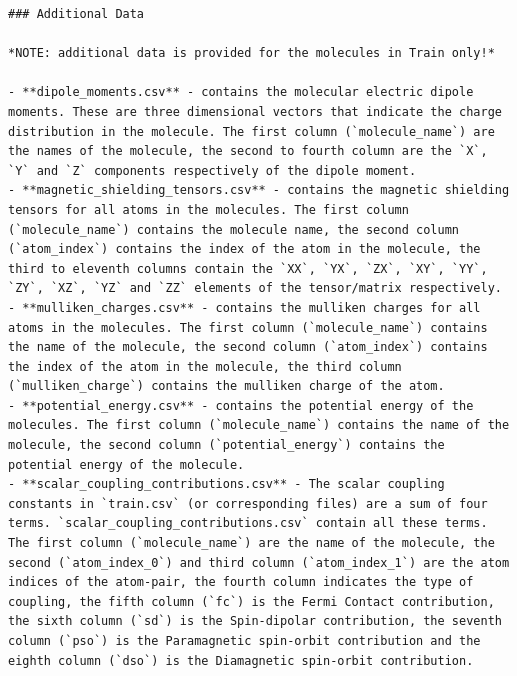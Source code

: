 \documentclass{article} %
\begin{document}
\begin{tcolorbox}[colback=lightgray!10, colframe=black, width=\textwidth, arc=2mm, boxrule=0.5mm, title=The original description for champs-scalar-coupling, breakable]
\begin{lstlisting}[basicstyle=\tiny\ttfamily, breaklines=true]
### Additional Data

*NOTE: additional data is provided for the molecules in Train only!*

- **dipole_moments.csv** - contains the molecular electric dipole moments. These are three dimensional vectors that indicate the charge distribution in the molecule. The first column (`molecule_name`) are the names of the molecule, the second to fourth column are the `X`, `Y` and `Z` components respectively of the dipole moment.
- **magnetic_shielding_tensors.csv** - contains the magnetic shielding tensors for all atoms in the molecules. The first column (`molecule_name`) contains the molecule name, the second column (`atom_index`) contains the index of the atom in the molecule, the third to eleventh columns contain the `XX`, `YX`, `ZX`, `XY`, `YY`, `ZY`, `XZ`, `YZ` and `ZZ` elements of the tensor/matrix respectively.
- **mulliken_charges.csv** - contains the mulliken charges for all atoms in the molecules. The first column (`molecule_name`) contains the name of the molecule, the second column (`atom_index`) contains the index of the atom in the molecule, the third column (`mulliken_charge`) contains the mulliken charge of the atom.
- **potential_energy.csv** - contains the potential energy of the molecules. The first column (`molecule_name`) contains the name of the molecule, the second column (`potential_energy`) contains the potential energy of the molecule.
- **scalar_coupling_contributions.csv** - The scalar coupling constants in `train.csv` (or corresponding files) are a sum of four terms. `scalar_coupling_contributions.csv` contain all these terms. The first column (`molecule_name`) are the name of the molecule, the second (`atom_index_0`) and third column (`atom_index_1`) are the atom indices of the atom-pair, the fourth column indicates the type of coupling, the fifth column (`fc`) is the Fermi Contact contribution, the sixth column (`sd`) is the Spin-dipolar contribution, the seventh column (`pso`) is the Paramagnetic spin-orbit contribution and the eighth column (`dso`) is the Diamagnetic spin-orbit contribution.
    \end{lstlisting}
\end{tcolorbox}
\label{fig:description.md}
\vspace{1cm}
\end{document}
